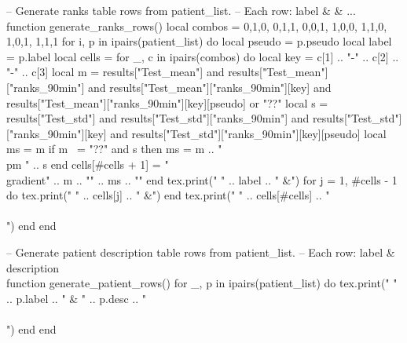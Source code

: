 \begin{luacode*}
        -- Generate ranks table rows from patient_list.
        -- Each row: label &  & ... \\
        function generate_ranks_rows()
        local combos = {
          {0,1,0}, {0,1,1}, {0,0,1}, {1,0,0}, {1,1,0}, {1,0,1}, {1,1,1}
        }
        for i, p in ipairs(patient_list) do
        local pseudo = p.pseudo
        local label = p.label
        local cells = {}
        for _, c in ipairs(combos) do
        local key = c[1] .. "-" .. c[2] .. "-" .. c[3]
        local m = results["Test_mean"] and results["Test_mean"]["ranks_90min"]
        and results["Test_mean"]["ranks_90min"][key]
        and results["Test_mean"]["ranks_90min"][key][pseudo] or "??"
        local s = results["Test_std"] and results["Test_std"]["ranks_90min"]
        and results["Test_std"]["ranks_90min"][key]
        and results["Test_std"]["ranks_90min"][key][pseudo]
        local ms = m
        if m ~= "??" and s then ms = m .. " \\pm " .. s end
        cells[#cells + 1] = "\\gradient{" .. m .. "}{" .. ms .. "}"
        end
        tex.print("        " .. label .. " &")
        for j = 1, #cells - 1 do
        tex.print("        " .. cells[j] .. " &")
        end
        tex.print("        " .. cells[#cells] .. " \\\\")
        end
        end

        -- Generate patient description table rows from patient_list.
        -- Each row: label & description \\
        function generate_patient_rows()
        for _, p in ipairs(patient_list) do
        tex.print("        " .. p.label .. " & " .. p.desc .. " \\\\")
        end
        end

      \end{luacode*}

      \newcommand{\patientlabel}[1]{%
        \directlua{
          local pseudo = "#1"
          local label = patient_labels[pseudo]
          if label then
          tex.print(label)
          else
          tex.print("??")
          end
        }%
      }

      \newcommand{\patientdesc}[1]{%
        \directlua{
          local pseudo = "#1"
          local desc = patient_descriptions[pseudo]
          if desc then
          tex.print(desc)
          else
          tex.print("??")
          end
        }%
      }

